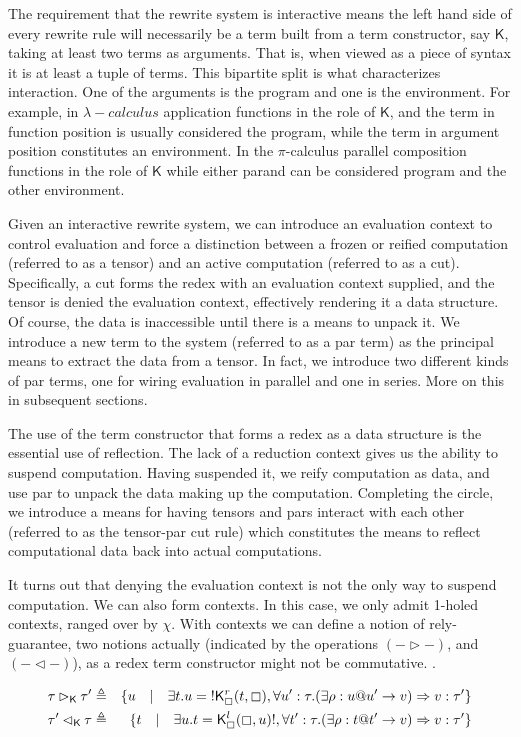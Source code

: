 \documentclass{llncs}
\renewcommand{\:}{\colon}
\newcommand{\pic}{$\pi$-calculus}
\begin{document}
The requirement that the rewrite system is interactive means the left
hand side of every rewrite rule will necessarily be a term built from
a term constructor, say $\mathsf{K}$, taking at least two terms as
arguments. That is, when viewed as a piece of syntax it is at least a
tuple of terms. This bipartite split is what characterizes
interaction. One of the arguments is the program and one is the
environment. For example, in $\lambda-calculus$ application functions
in the role of $\mathsf{K}$, and the term in function position is
usually considered the program, while the term in argument position
constitutes an environment. In the {\pic} parallel composition
functions in the role of $\mathsf{K}$ while either parand can be
considered program and the other environment.

Given an interactive rewrite system, we can introduce an evaluation
context to control evaluation and force a distinction between a frozen
or reified computation (referred to as a tensor) and an active
computation (referred to as a cut). Specifically, a cut forms the
redex with an evaluation context supplied, and the tensor is denied
the evaluation context, effectively rendering it a data structure. Of
course, the data is inaccessible until there is a means to unpack
it. We introduce a new term to the system (referred to as a par term)
as the principal means to extract the data from a tensor. In fact, we
introduce two different kinds of par terms, one for wiring evaluation
in parallel and one in series. More on this in subsequent sections.

The use of the term constructor that forms a redex as a data structure
is the essential use of reflection. The lack of a reduction context
gives us the ability to suspend computation. Having suspended it, we
reify computation as data, and use par to unpack the data making up
the computation. Completing the circle, we introduce a means for
having tensors and pars interact with each other (referred to as the tensor-par cut
rule) which constitutes the means to reflect computational data back into
actual computations.

It turns out that denying the evaluation context is not the only way
to suspend computation. We can also form contexts. In this case, we
only admit 1-holed contexts, ranged over by $\chi$. With contexts we can
define a notion of rely-guarantee, two notions actually (indicated by
the operations $(- \rhd -)$, and $(- \lhd -)$), as a redex term constructor
might not be commutative. .

\begin{eqnarray*}
\tau \rhd_{\mathsf{K}} \tau' & \triangleq & \{ u \quad | \quad \exists t. u = \mathsf{!}\mathsf{K}_{\boxempty}^{r}(t, \boxempty),\forall u' : \tau. (\exists \rho : u@u' \rightarrow v) \Rightarrow v:\tau' \} \\
\tau' \lhd_{\mathsf{K}} \tau & \triangleq & \{ t \quad | \quad \exists u. t = \mathsf{K}_{\boxempty}^{l}(\boxempty, u)\mathsf{!},\forall t' : \tau. (\exists \rho: t@t' \rightarrow v) \Rightarrow v : \tau' \}
\end{eqnarray*}
\end{document}
